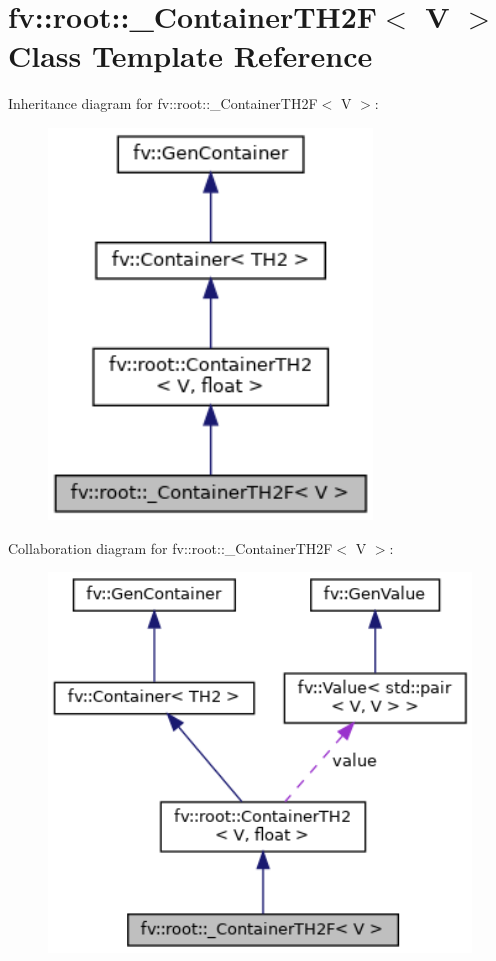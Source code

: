 \hypertarget{classfv_1_1root_1_1__ContainerTH2F}{}\section{fv\+:\+:root\+:\+:\+\_\+\+Container\+T\+H2F$<$ V $>$ Class Template Reference}
\label{classfv_1_1root_1_1__ContainerTH2F}


Inheritance diagram for fv\+:\+:root\+:\+:\+\_\+\+Container\+T\+H2F$<$ V $>$\+:
\nopagebreak
\begin{figure}[H]
\begin{center}
\leavevmode
\includegraphics[width=244pt]{classfv_1_1root_1_1__ContainerTH2F__inherit__graph}
\end{center}
\end{figure}


Collaboration diagram for fv\+:\+:root\+:\+:\+\_\+\+Container\+T\+H2F$<$ V $>$\+:
\nopagebreak
\begin{figure}[H]
\begin{center}
\leavevmode
\includegraphics[width=330pt]{classfv_1_1root_1_1__ContainerTH2F__coll__graph}
\end{center}
\end{figure}

